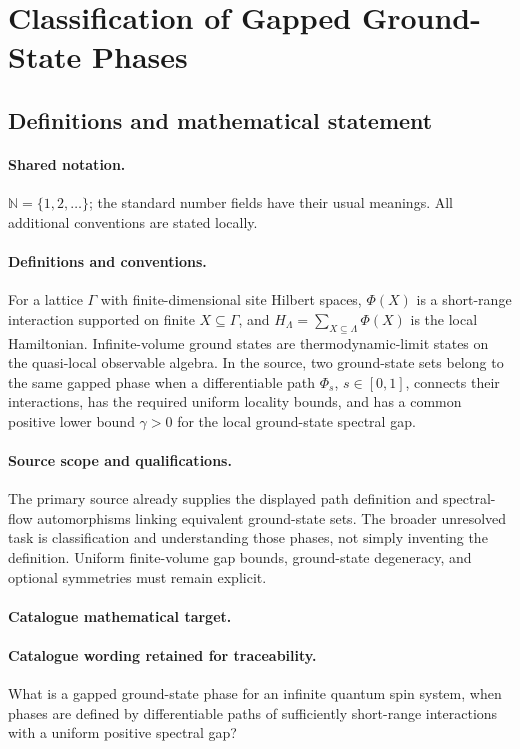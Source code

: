 \documentclass[11pt]{article}
\begin{document}
\section{Classification of Gapped Ground-State Phases}\label{statement}

\subsection{Definitions and mathematical statement}

\paragraph{Shared notation.}$\mathbb N=\{1,2,\ldots\}$; the standard number fields have their usual meanings. All additional conventions are stated locally.


\paragraph{Definitions and conventions.} For a lattice $\Gamma$ with finite-dimensional site Hilbert spaces, $\Phi(X)$ is a short-range interaction supported on finite $X\subseteq\Gamma$, and $H_\Lambda=\sum_{X\subseteq\Lambda}\Phi(X)$ is the local Hamiltonian. Infinite-volume ground states are thermodynamic-limit states on the quasi-local observable algebra. In the source, two ground-state sets belong to the same gapped phase when a differentiable path $\Phi_s$, $s\in[0,1]$, connects their interactions, has the required uniform locality bounds, and has a common positive lower bound $\gamma>0$ for the local ground-state spectral gap.

\paragraph{Source scope and qualifications.} The primary source already supplies the displayed path definition and spectral-flow automorphisms linking equivalent ground-state sets. The broader unresolved task is classification and understanding those phases, not simply inventing the definition. Uniform finite-volume gap bounds, ground-state degeneracy, and optional symmetries must remain explicit.

\paragraph{Catalogue mathematical target.}
\paragraph{Catalogue wording retained for traceability.}
What is a gapped ground-state phase for an infinite quantum spin system, when phases are defined by differentiable paths of sufficiently short-range interactions with a uniform positive spectral gap?
\end{document}
